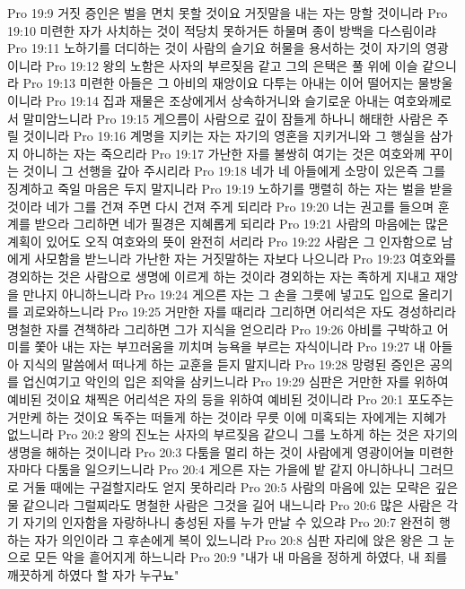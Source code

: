 Pro 19:9  거짓 증인은 벌을 면치 못할 것이요 거짓말을 내는 자는 망할 것이니라
Pro 19:10  미련한 자가 사치하는 것이 적당치 못하거든 하물며 종이 방백을 다스림이랴
Pro 19:11  노하기를 더디하는 것이 사람의 슬기요 허물을 용서하는 것이 자기의 영광이니라
Pro 19:12  왕의 노함은 사자의 부르짖음 같고 그의 은택은 풀 위에 이슬 같으니라
Pro 19:13  미련한 아들은 그 아비의 재앙이요 다투는 아내는 이어 떨어지는 물방울이니라
Pro 19:14  집과 재물은 조상에게서 상속하거니와 슬기로운 아내는 여호와께로서 말미암느니라
Pro 19:15  게으름이 사람으로 깊이 잠들게 하나니 해태한 사람은 주릴 것이니라
Pro 19:16  계명을 지키는 자는 자기의 영혼을 지키거니와 그 행실을 삼가지 아니하는 자는 죽으리라
Pro 19:17  가난한 자를 불쌍히 여기는 것은 여호와께 꾸이는 것이니 그 선행을 갚아 주시리라
Pro 19:18  네가 네 아들에게 소망이 있은즉 그를 징계하고 죽일 마음은 두지 말지니라
Pro 19:19  노하기를 맹렬히 하는 자는 벌을 받을 것이라 네가 그를 건져 주면 다시 건져 주게 되리라
Pro 19:20  너는 권고를 들으며 훈계를 받으라 그리하면 네가 필경은 지혜롭게 되리라
Pro 19:21  사람의 마음에는 많은 계획이 있어도 오직 여호와의 뜻이 완전히 서리라
Pro 19:22  사람은 그 인자함으로 남에게 사모함을 받느니라 가난한 자는 거짓말하는 자보다 나으니라
Pro 19:23  여호와를 경외하는 것은 사람으로 생명에 이르게 하는 것이라 경외하는 자는 족하게 지내고 재앙을 만나지 아니하느니라
Pro 19:24  게으른 자는 그 손을 그릇에 넣고도 입으로 올리기를 괴로와하느니라
Pro 19:25  거만한 자를 때리라 그리하면 어리석은 자도 경성하리라 명철한 자를 견책하라 그리하면 그가 지식을 얻으리라
Pro 19:26  아비를 구박하고 어미를 쫓아 내는 자는 부끄러움을 끼치며 능욕을 부르는 자식이니라
Pro 19:27  내 아들아 지식의 말씀에서 떠나게 하는 교훈을 듣지 말지니라
Pro 19:28  망령된 증인은 공의를 업신여기고 악인의 입은 죄악을 삼키느니라
Pro 19:29  심판은 거만한 자를 위하여 예비된 것이요 채찍은 어리석은 자의 등을 위하여 예비된 것이니라
Pro 20:1  포도주는 거만케 하는 것이요 독주는 떠들게 하는 것이라 무릇 이에 미혹되는 자에게는 지혜가 없느니라
Pro 20:2  왕의 진노는 사자의 부르짖음 같으니 그를 노하게 하는 것은 자기의 생명을 해하는 것이니라
Pro 20:3  다툼을 멀리 하는 것이 사람에게 영광이어늘 미련한 자마다 다툼을 일으키느니라
Pro 20:4  게으른 자는 가을에 밭 같지 아니하나니 그러므로 거둘 때에는 구걸할지라도 얻지 못하리라
Pro 20:5  사람의 마음에 있는 모략은 깊은 물 같으니라 그럴찌라도 명철한 사람은 그것을 길어 내느니라
Pro 20:6  많은 사람은 각기 자기의 인자함을 자랑하나니 충성된 자를 누가 만날 수 있으랴
Pro 20:7  완전히 행하는 자가 의인이라 그 후손에게 복이 있느니라
Pro 20:8  심판 자리에 앉은 왕은 그 눈으로 모든 악을 흩어지게 하느니라
Pro 20:9  "내가 내 마음을 정하게 하였다, 내 죄를 깨끗하게 하였다 할 자가 누구뇨"
